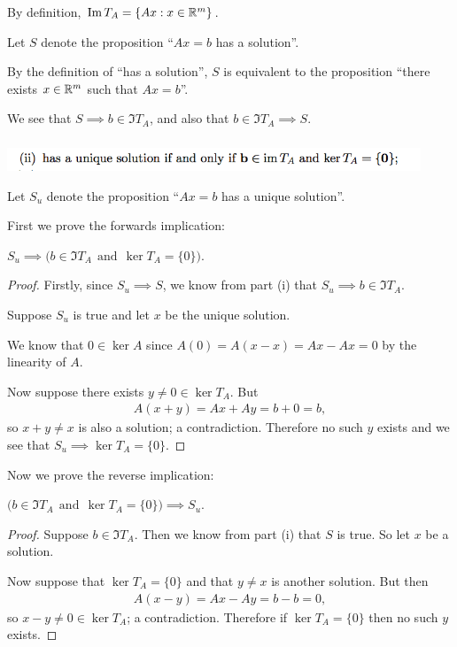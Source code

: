 \documentclass[12pt]{article}
\begin{document}
By definition,  $\operatorname{\mathrm{Im}} T_A = \{Ax: x \in \mathbb{R}^m\}$.

Let $S$ denote the proposition ``$Ax = b$ has a solution''.

By the definition of ``has a solution'', $S$ is equivalent to the proposition
``there exists $x \in \mathbb{R}^m$ such that $Ax = b$''.

We see that $S \implies b \in \Im T_A$, and also that $b \in \Im T_A \implies S$.

\subsubsection*{} %
\begin{mdframed}
\includegraphics[width=350pt]{img/oxford-prelims-2017-A-2-1-2.png}
\end{mdframed}

Let $S_u$ denote the proposition ``$Ax = b$ has a unique solution''.

First we prove the forwards implication:

\begin{claim*}
  $S_u \implies \Big(b \in \Im T_A ~~\text{and}~~ \ker T_A = \{0\}\Big)$.
\end{claim*}

\begin{proof}
Firstly, since $S_u \implies S$, we know from part (i) that
$S_u \implies b \in \Im T_A$.

Suppose $S_u$ is true and let $x$ be the unique solution.

We know that $0 \in \ker A$ since $A(0) = A(x - x) = Ax - Ax = 0$ by the
linearity of $A$.

Now suppose there exists $y \neq 0 \in \ker T_A$. But
\begin{align*}
A(x + y) = Ax + Ay = b + 0 = b,
\end{align*}
so $x + y \neq x$ is also a solution; a contradiction. Therefore no such $y$
exists and we see that $S_u \implies \ker T_A = \{0\}$.
\end{proof}

Now we prove the reverse implication:

\begin{claim*}
  $\Big(b \in \Im T_A ~~\text{and}~~ \ker T_A = \{0\}\Big) \implies S_u$.
\end{claim*}

\begin{proof}
  Suppose $b \in \Im T_A$. Then we know from part (i) that $S$ is true. So let
  $x$ be a solution.

Now suppose that $\ker T_A = \{0\}$ and that $y \neq x$ is another solution. But then
\begin{align*}
  A(x - y) = Ax - Ay = b - b = 0,
\end{align*}
so $x - y \neq 0 \in \ker T_A$; a contradiction. Therefore if $\ker T_A = \{0\}$
then no such $y$ exists.
\end{proof}
\end{document}
